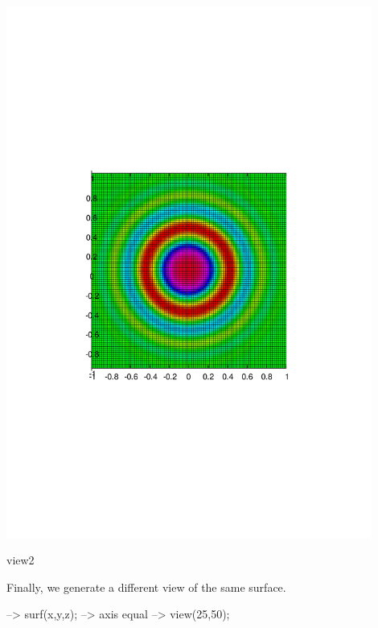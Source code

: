  
\begin{DoxyImage}
\includegraphics[width=12cm]{view2}
\caption{view2}
\end{DoxyImage}
 Finally, we generate a different view of the same surface.


\begin{DoxyVerbInclude}
--> surf(x,y,z);
--> axis equal
--> view(25,50);
\end{DoxyVerbInclude}


